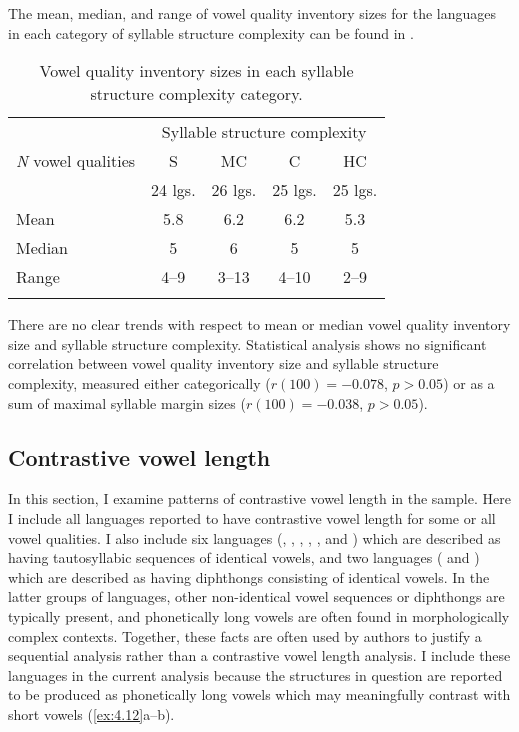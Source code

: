   The mean, median, and range of vowel quality inventory sizes for the languages in each category of syllable structure complexity can be found in .

\begin{table}
\begin{tabular}{lcccc}
\lsptoprule
 & \multicolumn{4}{c}{Syllable structure complexity}\\\cmidrule(lr){2-5}
\textit{N} vowel qualities & S & MC & C & HC\\
                           & 24 lgs. & 26 lgs.    & 25 lgs. & 25 lgs.\\\midrule
{Mean} & 5.8 & 6.2 & 6.2 & 5.3\\
{Median} & 5 & 6 & 5 & 5\\
{Range} & 4--9 & 3--13 & 4--10 & 2--9\\
\lspbottomrule
\end{tabular}
\caption{\label{tab:4.2}Vowel quality inventory sizes in each syllable structure complexity category.}
\end{table}

  There are no clear trends with respect to mean or median vowel quality inventory size and syllable structure complexity. Statistical analysis shows no significant correlation between vowel quality inventory size and syllable structure complexity, measured either categorically ($r(100) = -0.078$, $p > 0.05$) or as a sum of maximal syllable margin sizes ($r(100) = -0.038$, $p > 0.05$).

\subsection{Contrastive vowel length}\label{sec:4.3.2}

  In this section, I examine patterns of contrastive vowel length in the sample. Here I include all languages reported to have contrastive vowel length for some or all vowel qualities. I also include six languages (, , , , , and ) which are described as having tautosyllabic sequences of identical vowels, and two languages ( and ) which are described as having diphthongs consisting of identical vowels. In the latter groups of languages, other non-identical vowel sequences or diphthongs are typically present, and phonetically long vowels are often found in morphologically complex contexts. Together, these facts are often used by authors to justify a sequential analysis rather than a contrastive vowel length analysis. I include these languages in the current analysis because the structures in question are reported to be produced as phonetically long vowels which may meaningfully contrast with short vowels (\ref{ex:4.12}a--b).

